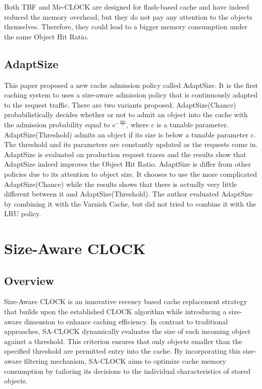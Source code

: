 \documentclass[conference]{IEEEtran}
\begin{document}
Both TBF and Me-CLOCK are designed for flash-based cache and have indeed reduced the memory overhead, but they do not pay any attention to the objects themselves. Therefore, they could lead to a bigger memory consumption under the same Object Hit Ratio.

\subsection{AdaptSize}
This paper proposed a new cache admission policy called AdaptSize. It is the first caching system to uses a size-aware admission policy that is continuously adapted to the request traffic. There are two variants proposed. AdaptSize(Chance) probabilistically decides whether or not to admit an object into the cache with the admission probability equal to $e^{-\frac{\text{size}}{c}}$, where c is a tunable parameter. AdaptSize(Threshold) admits an object if its size is below a tunable parameter c. The threshold and its parameters are constantly updated as the requests come in. AdaptSize is evaluated on production request traces and the results show that AdaptSize indeed improves the Object Hit Ratio.
AdaptSize is differ from other policies due to its attention to object size. It chooses to use the more complicated AdaptSize(Chance) while the results shows that there is actually very little different between it and AdaptSize(Threshold). The author evaluated AdaptSize by combining it with the Varnish Cache, but did not tried to combine it with the LRU policy.

\section{Size-Aware CLOCK}
\subsection{Overview}
Size-Aware CLOCK is an innovative recency based cache replacement strategy that builds upon the established CLOCK algorithm while introducing a size-aware dimension to enhance caching efficiency. In contrast to traditional approaches, SA-CLOCK dynamically evaluates the size of each incoming object against a threshold. This criterion ensures that only objects smaller than the specified threshold are permitted entry into the cache. By incorporating this size-aware filtering mechanism, SA-CLOCK aims to optimize cache memory consumption by tailoring its decisions to the individual characteristics of stored objects.
\end{document}
